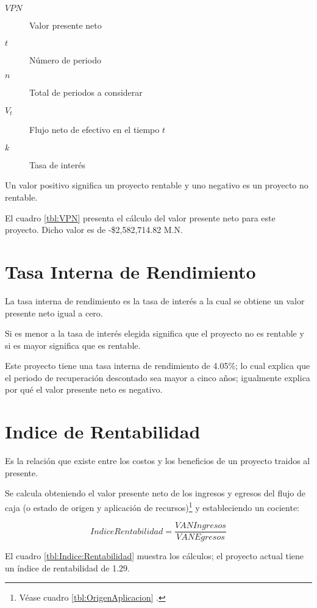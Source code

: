 \begin{description}
	\item[$VPN$] Valor presente neto
	\item[$t$] Número de periodo
	\item[$n$] Total de periodos a considerar
	\item[$V_t$] Flujo neto de efectivo en el tiempo $t$
	\item[$k$] Tasa de interés
\end{description}

Un valor positivo significa un proyecto rentable y uno negativo es un proyecto no rentable.

El cuadro \ref{tbl:VPN} presenta el cálculo del valor presente neto para este proyecto. Dicho valor es de -\$2,582,714.82 M.N.



\section{Tasa Interna de Rendimiento}

La tasa interna de rendimiento es la tasa de interés a la cual se obtiene un valor presente neto igual a cero.

Si es menor a la tasa de interés elegida significa que el proyecto no es rentable y si es mayor significa que es rentable.

Este proyecto tiene una tasa interna de rendimiento de 4.05\%; lo cual explica que el periodo de recuperación descontado sea mayor a cinco años; igualmente explica por qué el valor presente neto es negativo.

\section{Indice de Rentabilidad}

Es la relación que existe entre los costos y los beneficios de un proyecto traidos al presente.

Se calcula obteniendo el valor presente neto de los ingresos y egresos del flujo de caja (o estado de origen y aplicación de recursos)\footnote{Véase cuadro \ref{tbl:OrigenAplicacion} \pageref{tbl:OrigenAplicacion}.} y estableciendo un cociente:

$$Indice Rentabilidad = \frac{VAN Ingresos}{VAN Egresos} $$

El cuadro \ref{tbl:Indice:Rentabilidad} muestra los cálculos; el proyecto actual tiene un índice de rentabilidad de 1.29.


